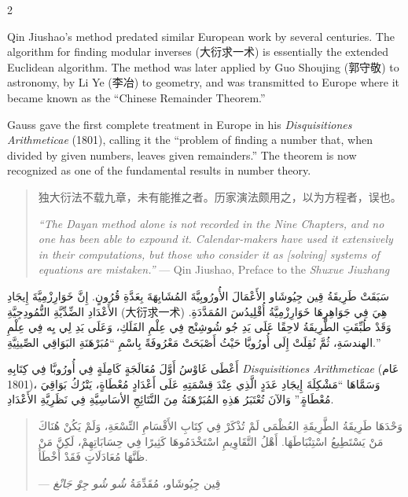 \documentclass[11pt,a4paper]{article}
\newcommand{\ar}[1]{\arabicfont\beginR #1\endR}
\providecommand{\enquote}[1]{``#1''}
\newcommand{\zhtext}[1]{{\chinese #1}}
\newenvironment{bilingual}{%
  \begin{paracol}{2}
}{%
  \end{paracol}
}
\begin{document}
\begin{bilingual}

\begin{leftcolumn*}
Qin Jiushao's method predated similar European work by several centuries. The algorithm for finding modular inverses (\zhtext{大衍求一术}) is essentially the extended Euclidean algorithm. The method was later applied by Guo Shoujing (\zhtext{郭守敬}) to astronomy, by Li Ye (\zhtext{李冶}) to geometry, and was transmitted to Europe where it became known as the ``Chinese Remainder Theorem.''

Gauss gave the first complete treatment in Europe in his \textit{Disquisitiones Arithmeticae} (1801), calling it the ``problem of finding a number that, when divided by given numbers, leaves given remainders.'' The theorem is now recognized as one of the fundamental results in number theory.

\begin{quote}
\zhtext{独大衍法不载九章，未有能推之者。历家演法颇用之，以为方程者，误也。}

\textit{``The Dayan method alone is not recorded in the Nine Chapters, and no one has been able to expound it. Calendar-makers have used it extensively in their computations, but those who consider it as [solving] systems of equations are mistaken.''} --- Qin Jiushao, Preface to the \textit{Shuxue Jiuzhang}
\end{quote}
\end{leftcolumn*}

\begin{rightcolumn*}
\ar{سَبَقَتْ طَرِيقَةُ قِين جِيُوشَاو الأَعْمَالَ الأُورُوبِيَّةَ المُشَابِهَةَ بِعَدَّةِ قُرُونٍ. إِنَّ خَوَارِزْمِيَّةَ إِيجَادِ الأَعْدَادِ الضِّدِّيَّةِ النُّمُودِجِيَّةِ (大衍求一术) هِيَ فِي جَوَاهِرِهَا خَوَارِزْمِيَّةُ أُقْلِيدُسَ المُمَدَّدَةِ. وَقَدْ طُبِّقَتِ الطَّرِيقَةُ لاحِقًا عَلَى يَدِ جُو شُوشِنْج فِي عِلْمِ الفَلَكِ، وَعَلَى يَدِ لِي يِه فِي عِلْمِ الهندسَةِ، ثُمَّ نُقِلَتْ إِلَى أُورُوبَّا حَيْثُ أَصْبَحَتْ مَعْرُوفَةً بِاسْمِ \enquote{مُبَرْهَنَةِ البَوَاقِي الصِّينِيَّةِ.}}

\ar{أَعْطَى غَاوْسُ أَوَّلَ مُعَالَجَةٍ كَامِلَةٍ فِي أُورُوبَّا فِي كِتَابِهِ \textit{Disquisitiones Arithmeticae} (عَام 1801)، وَسَمَّاهَا \enquote{مَشْكِلَةَ إِيجَادِ عَدَدٍ الَّذِي عِنْدَ قِسْمَتِهِ عَلَى أَعْدَادٍ مُعْطَاةٍ، يَتْرُكُ بَوَاقِيَ مُعْطَاةٍ.} وَالآنَ تُعْتَبَرُ هَذِهِ المُبَرْهَنَةُ مِنَ النَّتَائِجِ الأسَاسِيَّةِ فِي نَظَرِيَّةِ الأَعْدَادِ.}

\begin{quote}
\ar{وَحْدَهَا طَرِيقَةُ الطَّرِيقَةِ العُظْمَى لَمْ تُذْكَرْ فِي كِتَابِ الأَقْسَامِ التِّسْعَةِ، وَلَمْ يَكُنْ هُنَاكَ مَنْ يَسْتَطِيعُ اسْتِنْبَاطَهَا. أَهْلُ التَّقَاوِيمِ اسْتَخْدَمُوهَا كَثِيرًا فِي حِسَابَاتِهِمْ، لَكِنَّ مَنْ ظَنَّهَا مُعَادَلَاتٍ فَقَدْ أَخْطَأَ.}

\ar{--- قِين جِيُوشَاو، مُقَدِّمَةُ \textit{شُو شُو جِوْ جَانْغ}}
\end{quote}
\end{rightcolumn*}

\end{bilingual}
\end{document}

